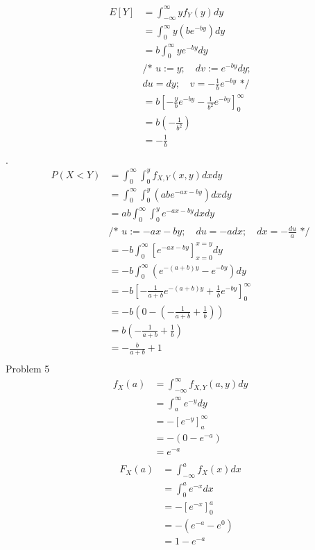 \documentclass[12pt,border=4pt,multi]{article} %
\begin{document}
\begin{align*}
E[Y] &= \int_{-\infty}^{\infty} y f_Y(y) dy\\
&= \int_{0}^{\infty} y (be^{-by}) dy\\
&= b\int_{0}^{\infty} y e^{-by} dy\\
&\text{/* } u:= y;\quad dv := e^{-by}dy;\\
&du = dy;\quad v = -\frac{1}{b}e^{-by}\text{ */}\\
&= b\left[-\frac{y}{b}e^{-by} - \frac{1}{b^2}e^{-by}\right]_0^{\infty}\\
&= b\left(-\frac{1}{b^2}\right)\\\
&= \boxed{-\frac{1}{b}}\\
\end{align*}
\newpage
{}.
\begin{align*}
P(X < Y) &= \int_{0}^{\infty} \int_{0}^{y} f_{X, Y}(x, y) dx dy\\
&= \int_{0}^{\infty} \int_{0}^{y} (abe^{-ax - by}) dx dy\\
&= ab\int_{0}^{\infty} \int_{0}^{y} e^{-ax - by} dx dy\\
&\text{/* } u := - ax - by;\quad du = -adx;\quad dx = -\frac{du}{a}\text{ */}\\
&= -b\int_{0}^{\infty} \left[e^{-ax - by}\right]_{x = 0}^{x = y} dy\\
&= -b\int_{0}^{\infty} \left(e^{-(a + b)y} - e^{-by}\right) dy\\
&= -b\left[-\frac{1}{a + b}e^{-(a + b)y} + \frac{1}{b}e^{-by}\right]_0^{\infty}\\
&= -b\left(0 - \left(-\frac{1}{a + b} + \frac{1}{b}\right)\right)\\
&= b\left(-\frac{1}{a + b} + \frac{1}{b}\right)\\
&= \boxed{-\frac{b}{a + b} + 1}\\
\end{align*}
\newpage
\noindent
Problem 5
\begin{align*}
f_X(a) &= \int_{-\infty}^{\infty} f_{X, Y}(a, y)dy\\
&= \int_{a}^{\infty} e^{-y} dy\\
&= -\left[e^{-y}\right]_a^{\infty}\\
&= -(0 - e^{-a})\\
&= e^{-a}\\
\end{align*}
\begin{align*}
F_X(a) &= \int_{-\infty}^{a} f_X(x) dx\\
&= \int_{0}^{a} e^{-x} dx\\
&= -[e^{-x}]_0^a\\
&= -(e^{-a} - e^0)\\
&= 1 - e^{-a}\\
\end{align*}
\end{document}
